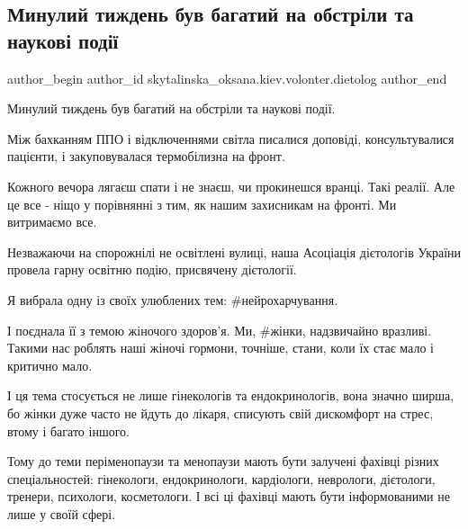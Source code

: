  
 
 
 
 
 
\subsection{Минулий тиждень був багатий на обстріли та наукові події}
\label{sec:17_12_2022.fb.skytalinska_oksana.kiev.volonter.dietolog.1.tyzhden}
 
\ifcmt
 author_begin
   author_id skytalinska_oksana.kiev.volonter.dietolog
 author_end
\fi

Минулий тиждень був багатий на обстріли та наукові події.

Між бахканням ППО і відключеннями світла писалися доповіді, консультувалися
пацієнти, і закуповувалася термобілизна на фронт.

Кожного вечора лягаєш спати і не знаєш, чи прокинешся вранці. Такі реалії. Але
це все - ніщо у порівнянні з тим, як нашим захисникам на фронті. Ми витримаємо
все.

Незважаючи на спорожнілі не освітлені вулиці, наша Асоціація дієтологів України
провела гарну освітню подію, присвячену дієтології.

Я вибрала одну із своїх улюблених тем: \#нейрохарчування. 

І поєднала її з темою жіночого здоров'я. Ми, \#жінки, надзвичайно вразливі.
Такими нас роблять наші жіночі гормони, точніше, стани, коли їх стає мало і
критично мало.

І ця тема стосується не лише гінекологів та ендокринологів, вона значно ширша,
бо жінки дуже часто не йдуть до лікаря, списують свій дискомфорт на стрес,
втому і багато іншого.

Тому до теми періменопаузи та менопаузи мають бути залучені фахівці різних
спеціальностей: гінекологи, ендокринологи, кардіологи, неврологи, дієтологи,
тренери, психологи, косметологи. І всі ці фахівці мають бути інформованими не
лише у своїй сфері.


